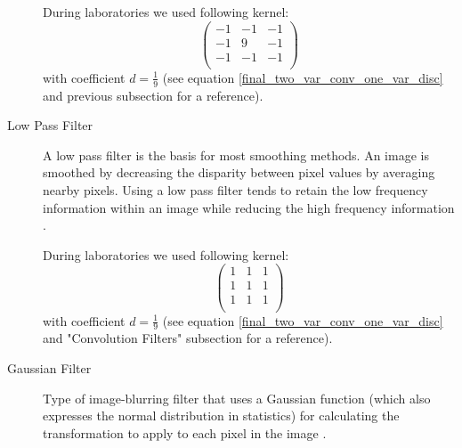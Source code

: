 \documentclass{article}
\begin{document}
\begin{description}
During laboratories we used following kernel:
\[
\begin{pmatrix}
  -1 & -1 & -1 \\
  -1 & 9 & -1 \\
  -1 & -1 & -1  \\
 \end{pmatrix}
 \]
with coefficient $d = \frac{1}{9}$ (see equation \ref{final_two_var_conv_one_var_disc} and previous subsection for a reference). 

%
%
\item[Low Pass Filter]
A low pass filter is the basis for most smoothing methods. An image is smoothed by decreasing the disparity between pixel values by averaging nearby pixels. Using a low pass filter tends to retain the low frequency information within an image while reducing the high frequency information \cite{high_pass_def}.

During laboratories we used following kernel:
\[
\begin{pmatrix}
  1 & 1 & 1 \\
  1 & 1 & 1 \\
  1 & 1 & 1  \\
 \end{pmatrix}
 \]
with coefficient $d = \frac{1}{9}$ (see equation \ref{final_two_var_conv_one_var_disc} and "Convolution Filters" subsection for a reference). 

%
% 
\item[Gaussian Filter] Type of image-blurring filter that uses a Gaussian function (which also expresses the normal distribution in statistics) for calculating the transformation to apply to each pixel in the image \cite{gaussian_blur}.


\end{description}
\end{document}
